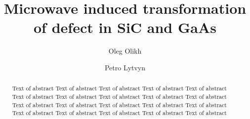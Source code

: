 \documentclass[final,3p,times,twocolumn,authoryear]{elsarticle}
\begin{document}
\begin{frontmatter}



\title{Microwave induced transformation of defect in SiC and GaAs}

\author[label1]{Oleg Olikh}

\author[label2]{Petro Lytvyn}


\begin{abstract}
Text of abstract Text of abstract Text of abstract Text of abstract
Text of abstract Text of abstract Text of abstract Text of abstract
Text of abstract Text of abstract Text of abstract Text of abstract
Text of abstract Text of abstract Text of abstract Text of abstract
Text of abstract Text of abstract Text of abstract Text of abstract
\end{abstract}


\end{frontmatter}
\end{document}

